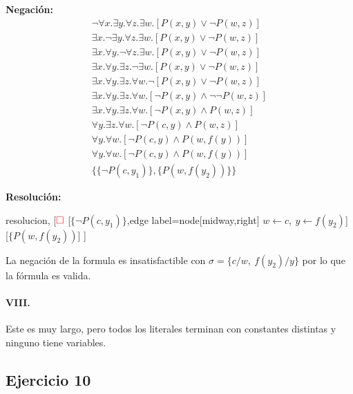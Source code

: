 \documentclass[10pt,a4paper]{article}
\begin{document}
\begin{multicols}{2}
\textbf{Negación:}
\begin{align*}
\lnot \forall x. \exists y. \forall z. \exists w. [P(x,y) \lor \lnot P(w,z)]  \\[1pt]
\exists x. \lnot \exists y. \forall z. \exists w. [P(x,y) \lor \lnot P(w,z)] \\[1pt]
\exists x. \forall y. \lnot \forall z. \exists w. [P(x,y) \lor \lnot P(w,z)]  \\[1pt]
\exists x. \forall y. \exists z. \lnot \exists w. [P(x,y) \lor \lnot P(w,z)] \\[1pt]
\exists x. \forall y. \exists z. \forall w. \lnot [P(x,y) \lor \lnot P(w,z)]  \\[1pt]
\exists x. \forall y. \exists z. \forall w. [\lnot P(x,y) \land \lnot \lnot P(w,z)] \\[1pt]
\exists x. \forall y. \exists z. \forall w. [\lnot P(x,y) \land P(w,z)] \\[1pt]
\forall y. \exists z. \forall w. [\lnot P(c,y) \land P(w,z)] \\[1pt]
\forall y.\forall w. [\lnot P(c,y) \land P(w,f(y))] \\[1pt]
\forall y. \forall w. [\lnot P(c,y) \land P(w,f(y))] \\[1pt]
\{\{ \lnot P(c,y_1) \}, \{P(w,f(y_2)) \} \}
\end{align*}

\textbf{Resolución:}
\begin{center}
	\begin{forest} resolucion,
[${\color{red}\Box}$ 
	[$\{ \lnot P(c\comma y_1) \}$,edge label={node[midway,right] {$w\leftarrow c,~y\leftarrow f(y_2)$}}]
	[$\{P(w \comma f(y_2))$]
]
	\end{forest}
\end{center}
La negación de la formula es insatisfactible con $\sigma = \{ c/w,~f(y_2)/y\}$ por lo que la fórmula es valida.
\end{multicols}


\paragraph{VIII.} Este es muy largo, pero todos los literales terminan con constantes distintas y ninguno tiene variables.


\subsection{Ejercicio 10}
\end{document}
